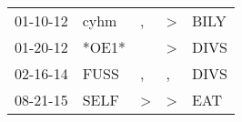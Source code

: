\begin{supertabular}{lllll}
 01-10-12 &   cyhm &             , &  \textgreater &  BILY \\
 01-20-12 &  *OE1* &               &  \textgreater &  DIVS \\
 02-16-14 &   FUSS &             , &             , &  DIVS \\
 08-21-15 &   SELF &  \textgreater &  \textgreater &   EAT \\
\end{supertabular}
